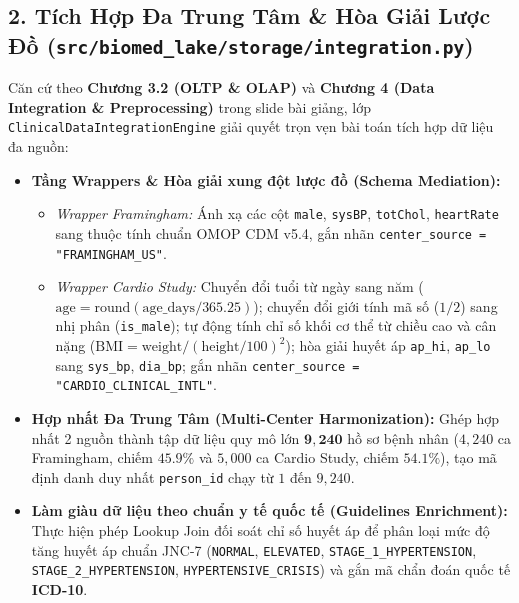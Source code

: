 \documentclass[11pt,a4paper]{article}
\begin{document}
\subsection{2. Tích Hợp Đa Trung Tâm \& Hòa Giải Lược Đồ (\texttt{src/biomed_lake/storage/integration.py})}
Căn cứ theo \textbf{Chương 3.2 (OLTP \& OLAP)} và \textbf{Chương 4 (Data Integration \& Preprocessing)} trong slide bài giảng, lớp \texttt{ClinicalDataIntegrationEngine} giải quyết trọn vẹn bài toán tích hợp dữ liệu đa nguồn:
\begin{itemize}
    \item \textbf{Tầng Wrappers \& Hòa giải xung đột lược đồ (Schema Mediation):}
    \begin{itemize}
        \item \textit{Wrapper Framingham:} Ánh xạ các cột \texttt{male}, \texttt{sysBP}, \texttt{totChol}, \texttt{heartRate} sang thuộc tính chuẩn OMOP CDM v5.4, gắn nhãn \texttt{center\_source = "FRAMINGHAM\_US"}.
        \item \textit{Wrapper Cardio Study:} Chuyển đổi tuổi từ ngày sang năm ($\text{age} = \text{round}(\text{age\_days} / 365.25)$); chuyển đổi giới tính mã số ($1/2$) sang nhị phân (\texttt{is\_male}); tự động tính chỉ số khối cơ thể từ chiều cao và cân nặng ($\text{BMI} = \text{weight} / (\text{height}/100)^2$); hòa giải huyết áp \texttt{ap\_hi}, \texttt{ap\_lo} sang \texttt{sys\_bp}, \texttt{dia\_bp}; gắn nhãn \texttt{center\_source = "CARDIO\_CLINICAL\_INTL"}.
    \end{itemize}
    \item \textbf{Hợp nhất Đa Trung Tâm (Multi-Center Harmonization):}
    Ghép hợp nhất 2 nguồn thành tập dữ liệu quy mô lớn $\mathbf{9{,}240}$ hồ sơ bệnh nhân ($4{,}240$ ca Framingham, chiếm $45.9\%$ và $5{,}000$ ca Cardio Study, chiếm $54.1\%$), tạo mã định danh duy nhất \texttt{person\_id} chạy từ $1$ đến $9{,}240$.
    \item \textbf{Làm giàu dữ liệu theo chuẩn y tế quốc tế (Guidelines Enrichment):}
    Thực hiện phép Lookup Join đối soát chỉ số huyết áp để phân loại mức độ tăng huyết áp chuẩn JNC-7 (\texttt{NORMAL}, \texttt{ELEVATED}, \texttt{STAGE\_1\_HYPERTENSION}, \texttt{STAGE\_2\_HYPERTENSION}, \texttt{HYPERTENSIVE\_CRISIS}) và gắn mã chẩn đoán quốc tế \textbf{ICD-10}.
\end{itemize}
\end{document}
